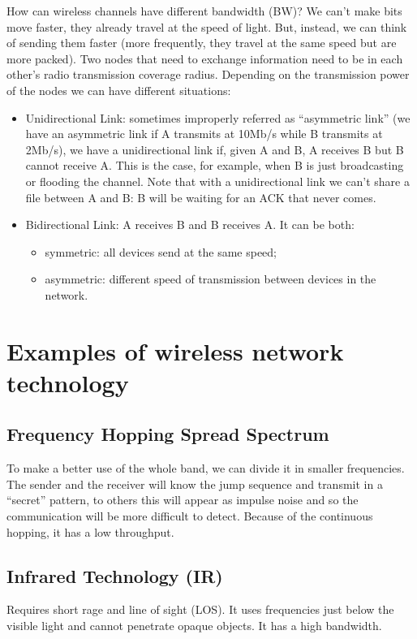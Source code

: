 How can wireless channels have different bandwidth (BW)? We can't make 
bits move faster, they already travel at the speed of light. But, instead, we 
can think of sending them faster (more frequently, they travel at the same 
speed but are more packed).
Two nodes that need to exchange information need to be in each other's 
radio transmission coverage radius. Depending on the transmission power of the 
nodes we can have different situations:
\begin{itemize}
\item Unidirectional Link: sometimes improperly referred as 
  ``asymmetric link'' (we have an asymmetric link if A transmits at 10Mb/s while
  B transmits at 2Mb/s), we have a unidirectional link if, given A and B, A
  receives B but B cannot receive A. This is the case, for example, when B is
  just broadcasting or flooding the channel. Note that with a unidirectional
  link we can't share a file between A and B: B will be waiting for an ACK that
  never comes.
\item Bidirectional Link: A receives B and B receives A. It can be both:
 \begin{itemize}
 	\item symmetric: all devices send at the same speed;
 	\item asymmetric: different speed of transmission between devices in the network.
 \end{itemize}
\end{itemize}

\section{Examples of wireless network technology}

\subsection{Frequency Hopping Spread Spectrum}
To make a better use of the whole band, we can divide it in smaller frequencies.
The sender and the receiver will know the jump sequence and transmit in a
``secret'' pattern, to others this will appear as impulse noise and so the
communication will be more difficult to detect. Because of the continuous
hopping, it has a low throughput.

\subsection{Infrared Technology (IR)}
Requires short rage and line of 
sight (LOS). It uses frequencies just below the visible light and cannot 
penetrate opaque objects. It has a high bandwidth.

